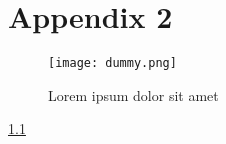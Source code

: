 \chapter{Appendix 2}
\label{appendix:appendix2}

\begin{figure}[H]
    \centering
    \texttt{[image: dummy.png]}
    \caption{Lorem ipsum dolor sit amet}
    \label{fig:figAppendix-2}
\end{figure}

\lipsum[1-1] \ref{fig:figAppendix-2}